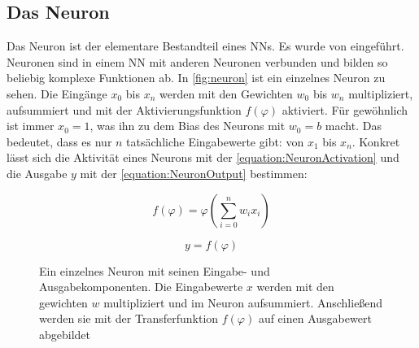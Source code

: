 \subsection{Das Neuron}
\label{chap:neuron}

Das Neuron ist der elementare Bestandteil eines \acp{NN}. Es wurde \citeyear{McCulloch1943} von \citeauthor{McCulloch1943} \cite{McCulloch1943} eingeführt. Neuronen sind in einem \ac{NN} mit anderen Neuronen verbunden und bilden so beliebig komplexe Funktionen ab. In \autoref{fig:neuron} ist ein einzelnes Neuron zu sehen. Die Eingänge $x_{0}$ bis $x_{n}$ werden mit den Gewichten $w_{0}$ bis $w_{n}$ multipliziert, aufsummiert und mit der Aktivierungsfunktion $f(\varphi)$ aktiviert. Für gewöhnlich ist immer $x_{0}=1$, was ihn zu dem Bias des Neurons mit $w_{0}=b$ macht. Das bedeutet, dass es nur $n$ tatsächliche Eingabewerte gibt: von $x_{1}$ bis $x_{n}$. Konkret lässt sich die Aktivität eines Neurons mit der \autoref{equation:NeuronActivation} und die Ausgabe $y$ mit der \autoref{equation:NeuronOutput} bestimmen:

\begin{equation}
  f(\varphi) = \varphi(\sum_{i=0}^{n}w_{i}x_{i})
  \label{equation:NeuronActivation}
\end{equation}

\begin{equation}
  y = f(\varphi)
  \label{equation:NeuronOutput}
\end{equation}

\begin{figure}
  \centering
  \caption{Ein einzelnes Neuron mit seinen Eingabe- und Ausgabekomponenten. Die Eingabewerte $x$ werden mit den gewichten $w$ multipliziert und im Neuron aufsummiert. Anschließend werden sie mit der Transferfunktion $f(\varphi)$ auf einen Ausgabewert abgebildet}
  \label{fig:neuron}
\end{figure}


